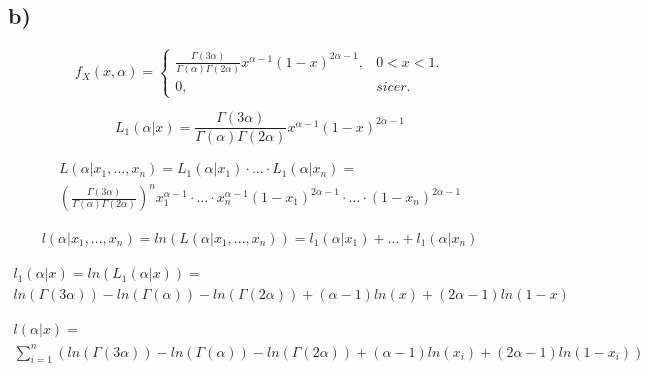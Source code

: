 \documentclass{article}
\begin{document}
\subsection*{b)}
\begin{equation*}
 f_X(x,\alpha) =\begin{cases}
 \frac{\Gamma(3\alpha)}{\Gamma(\alpha)\Gamma(2\alpha)} x^{\alpha-1}(1-x)^{2\alpha-1}, & 0<x<1.\\
0, & sicer.
\end{cases}
\end{equation*}

\begin{equation*}
L_1(\alpha|x) =  \frac{\Gamma(3\alpha)}{\Gamma(\alpha)\Gamma(2\alpha)} x^{\alpha-1}(1-x)^{2\alpha-1}
\end{equation*}

\begin{equation*}
\begin{split}
L(\alpha|x_1,...,x_n) =  L_1(\alpha|x_1) \cdot ... \cdot L_1(\alpha|x_n) =             \\ 
 \left( \frac{\Gamma(3\alpha)}{\Gamma(\alpha)\Gamma(2\alpha)} \right)^n x_1^{\alpha-1} \cdot ... \cdot x_n^{\alpha-1} (1-x_1)^{2\alpha-1} \cdot ... \cdot (1-x_n)^{2\alpha-1}
\end{split}
\end{equation*}

\begin{equation*}
\begin{split}
l(\alpha|x_1,...,x_n) = ln( L(\alpha|x_1,...,x_n)) = 
l_1(\alpha|x_1) + ... + l_1(\alpha|x_n)
\end{split}
\end{equation*}

\begin{equation*}
\begin{split}
l_1(\alpha|x) = ln(L_1(\alpha|x)) =\\ ln(\Gamma(3\alpha)) - ln(\Gamma(\alpha)) - ln(\Gamma(2\alpha)) + (\alpha-1)ln(x) + (2\alpha-1)ln(1-x)
\end{split}
\end{equation*}

\begin{equation*}
\begin{split}
l(\alpha|x) =\\ \sum_{i=1}^n\left( ln(\Gamma(3\alpha)) - ln(\Gamma(\alpha)) - ln(\Gamma(2\alpha)) + (\alpha-1)ln(x_i) + (2\alpha-1)ln(1-x_i) \right)
\end{split}
\end{equation*}
\end{document}
